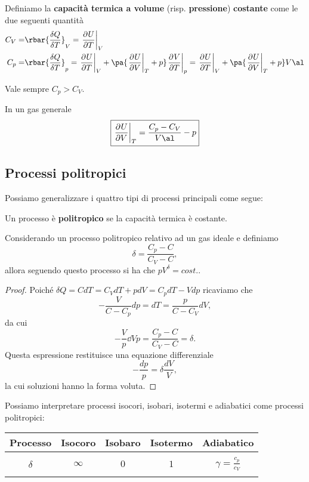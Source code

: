 \begin{definition}
Definiamo la \textbf{capacit\`a termica a volume} (risp. \textbf{pressione}) \textbf{costante} come le due seguenti quantit\`a
\begin{align*}
C_V=&\rbar{\frac{\delta Q}{\delta T}}_V=\ppb TUV\\
C_p=&\rbar{\frac{\delta Q}{\delta T}}_p=\ppb TUV +\pa{\ppb VUT+p}\ppb TVp=\ppb TUV +\pa{\ppb VUT+p}V\al
\end{align*}
\end{definition}

\begin{remark}\label{DisguguaglianzaCapacitaTermiche}
Vale sempre $C_p>C_V$.
\end{remark}

\begin{remark}\label{DerivataEnergiaInternaRispettoAlVolume}
In un gas generale
\[\boxed{\ppb VUT=\frac{C_p-C_V}{V\al}-p}\]
\end{remark}

\subsection{Processi politropici}
Possiamo generalizzare i quattro tipi di processi principali come segue:
\begin{definition}
Un processo \`e \textbf{politropico} se la capacit\`a termica \`e costante.
\end{definition}

\begin{proposition}\label{CurveProcessiPolitropici}
Considerando un processo politropico relativo ad un gas ideale e definiamo
\[\delta=\frac{C_p-C}{C_V-C},\]
allora seguendo questo processo si ha che $pV^\delta=cost.$.
\end{proposition}
\begin{proof}
Poich\'e $\delta Q=CdT=C_VdT+pdV=C_pdT-Vdp$ ricaviamo che
\[-\frac V{C-C_p}dp=dT=\frac p{C-C_V}dV,\]
da cui
\[-\frac Vp\dd Vp=\frac{C_p-C}{C_V-C}=\delta.\]
Questa espressione restituisce una equazione differenziale
\[-\frac{dp}p=\delta\frac{dV}V,\]
la cui soluzioni hanno la forma voluta.
\end{proof}

\noindent
Possiamo interpretare processi isocori, isobari, isotermi e adiabatici come processi politropici:
\begin{center}
\begin{tabular}[ht]{|c||c|c|c|c|}
\hline
Processo & Isocoro & Isobaro & Isotermo & Adiabatico\\\hline&&&&\\
$\delta$ & $\infty$ & $0$ & $1$ & $\displaystyle\gamma=\frac{c_p}{c_V}$\\ &&&&\\\hline
\end{tabular}
\end{center}



